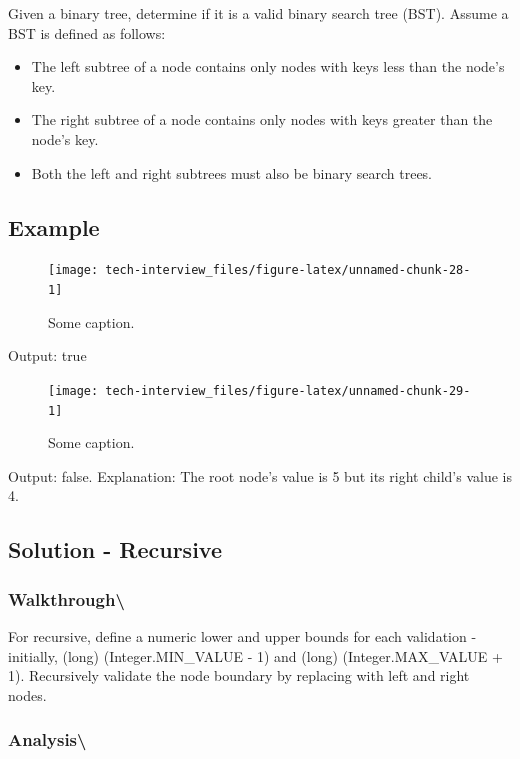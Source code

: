 \documentclass[]{book}
\providecommand{\tightlist}{%
  \setlength{\itemsep}{0pt}\setlength{\parskip}{0pt}}
\begin{document}
Given a binary tree, determine if it is a valid binary search tree (BST). Assume a BST is defined as follows:

\begin{itemize}
\tightlist
\item
  The left subtree of a node contains only nodes with keys less than the node's key.
\item
  The right subtree of a node contains only nodes with keys greater than the node's key.
\item
  Both the left and right subtrees must also be binary search trees.
\end{itemize}

\hypertarget{example-65}{%
\subsection{Example}\label{example-65}}

\begin{figure}
\texttt{[image: tech-interview\_files/figure-latex/unnamed-chunk-28-1]} \caption{Some caption.}\label{fig:unnamed-chunk-28}
\end{figure}

Output: true

\begin{figure}
\texttt{[image: tech-interview\_files/figure-latex/unnamed-chunk-29-1]} \caption{Some caption.}\label{fig:unnamed-chunk-29}
\end{figure}

Output: false. Explanation: The root node's value is 5 but its right child's value is 4.

\hypertarget{solution---recursive-4}{%
\subsection{Solution - Recursive}\label{solution---recursive-4}}

\hypertarget{walkthrough-78}{%
\subsubsection{Walkthrough\textbackslash{}}\label{walkthrough-78}}

For recursive, define a numeric lower and upper bounds for each validation - initially, (long) (Integer.MIN\_VALUE - 1)
and (long) (Integer.MAX\_VALUE + 1). Recursively validate the node boundary by replacing with left and right nodes.

\hypertarget{analysis-85}{%
\subsubsection{Analysis\textbackslash{}}\label{analysis-85}}
\end{document}
